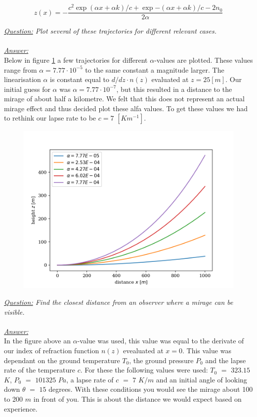 \documentclass{article}
\begin{document}
\begin{equation}
	z(x)=-\frac{c^2 \exp{(\alpha x + \alpha k)/c}+\exp{-(\alpha x + \alpha k)/c}-2n_0}{2 \alpha}
	\label{eq:magic_wolfram}
\end{equation}

\textit{\underline{Question:} Plot several of these trajectories for different relevant cases.}\\
\\
\textit{\underline{Answer:}} \\
Below in figure \ref{fig:paths} a few trajectories for different $\alpha$-values are plotted. These values range from $\alpha = 7.77 \cdot 10^{-5}$ to the same constant a magnitude larger. The linearisation $\alpha$ is constant equal to $d/dz \cdot n(z)$ evaluated at $z=25 [m]$. Our initial guess for $\alpha$ was $\alpha = 7.77 \cdot 10^{-7}$, but this resulted in a distance to the mirage of about half a kilometre. We felt that this does not represent an actual mirage effect and thus decided plot these alfa values. To get these values we had to rethink our lapse rate to be $c = 7$ $[Km^{-1}]$.\\

\begin{figure}[h!]
	\centering
	\includegraphics[width=0.5\linewidth,keepaspectratio]{afbeeldingen/light path.png}
	\label{fig:paths}
\end{figure}
\textit{\underline{Question:} Find the closest distance from an observer where a mirage can be visible.}\\
\\
\textit{\underline{Answer:}} \\
In the figure above an $\alpha$-value was used, this value was equal to the derivate of our index of refraction function $n(z)$ evealuated at $x=0$. This value was dependant on the ground temperature $T_0$, the ground pressure $P_0$ and the lapse rate of the temperature $c$. For these the following values were used: $T_0$ $=$ $323.15$ $K$, $P_0$ $=$ $101325$ $Pa$, a lapse rate of $c$ $=$ $7$ $K/m$ and an initial angle of looking down $\theta$ $=$ $15$ degrees. With these conditions you would see the mirage about 100 to 200 $m$ in front of you. This is about the distance we would expect based on experience.\\
\end{document}
